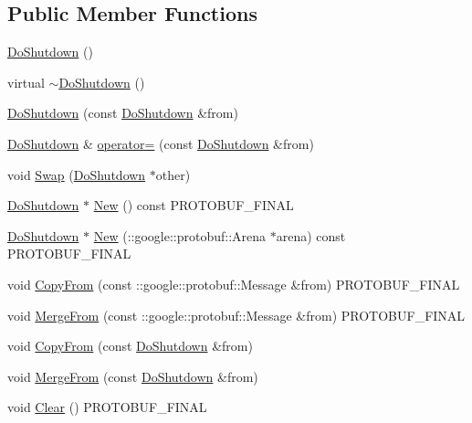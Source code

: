 \subsection*{Public Member Functions}
\begin{DoxyCompactItemize}
\item 
\hyperlink{class_do_shutdown_a9e41496fb2642ab0956aeb03e79f2ffc}{Do\+Shutdown} ()
\item 
virtual \hyperlink{class_do_shutdown_acdc83e4c56ce5cbdcb7c1ea6c146e75f}{$\sim$\+Do\+Shutdown} ()
\item 
\hyperlink{class_do_shutdown_abbb12bcbdeb136fe4896153ccefb4058}{Do\+Shutdown} (const \hyperlink{class_do_shutdown}{Do\+Shutdown} \&from)
\item 
\hyperlink{class_do_shutdown}{Do\+Shutdown} \& \hyperlink{class_do_shutdown_a254bcb06ff69ece5ed5ea7cdbe19e7dc}{operator=} (const \hyperlink{class_do_shutdown}{Do\+Shutdown} \&from)
\item 
void \hyperlink{class_do_shutdown_a331c8643e8b18c7b0bf2c1391de46067}{Swap} (\hyperlink{class_do_shutdown}{Do\+Shutdown} $\ast$other)
\item 
\hyperlink{class_do_shutdown}{Do\+Shutdown} $\ast$ \hyperlink{class_do_shutdown_a13aa27286876300bd7c506812f8479ba}{New} () const P\+R\+O\+T\+O\+B\+U\+F\+\_\+\+F\+I\+N\+AL
\item 
\hyperlink{class_do_shutdown}{Do\+Shutdown} $\ast$ \hyperlink{class_do_shutdown_af046b34c1f60919fb75263cf208c84df}{New} (\+::google\+::protobuf\+::\+Arena $\ast$arena) const P\+R\+O\+T\+O\+B\+U\+F\+\_\+\+F\+I\+N\+AL
\item 
void \hyperlink{class_do_shutdown_ad5876e00a840a19406a13ac089553f97}{Copy\+From} (const \+::google\+::protobuf\+::\+Message \&from) P\+R\+O\+T\+O\+B\+U\+F\+\_\+\+F\+I\+N\+AL
\item 
void \hyperlink{class_do_shutdown_a367300e6485923b044fdcea2630d4cc3}{Merge\+From} (const \+::google\+::protobuf\+::\+Message \&from) P\+R\+O\+T\+O\+B\+U\+F\+\_\+\+F\+I\+N\+AL
\item 
void \hyperlink{class_do_shutdown_aab7f76cef5e12622def6c90801e2cacf}{Copy\+From} (const \hyperlink{class_do_shutdown}{Do\+Shutdown} \&from)
\item 
void \hyperlink{class_do_shutdown_aded6118b22cf31c18d0fe58af6fce37e}{Merge\+From} (const \hyperlink{class_do_shutdown}{Do\+Shutdown} \&from)
\item 
void \hyperlink{class_do_shutdown_a88dae4aa7ac119a7b87dd08db805f4ee}{Clear} () P\+R\+O\+T\+O\+B\+U\+F\+\_\+\+F\+I\+N\+AL
\item 

\end{DoxyCompactItemize}
